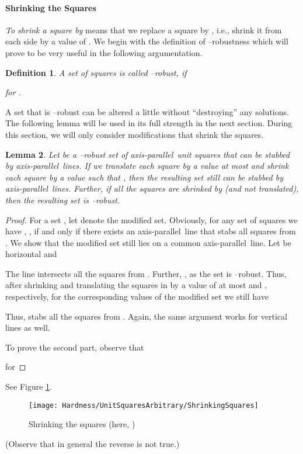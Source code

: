 \documentclass[12pt]{article}
\newtheorem{definition}{Definition}
\newtheorem{lemma}[definition]{Lemma}
\newcommand{\ap}{a.p.\ }
\renewcommand{\ap}{axis-parallel\ }
\begin{document}
\paragraph{Shrinking the Squares}
\emph{To shrink a square by } means that we replace a square  by , i.e., shrink it from each side by a value of . We begin with the definition of --robustness which will prove to be very useful in the following argumentation.
\begin{definition} A set  of squares is called \textit{--robust}, if

for .
\end{definition}
A set that is --robust can be altered a little without ``destroying'' any solutions. The following lemma will be used in its full strength in the next section. During this section, we will only consider modifications that shrink the squares. 
\begin{lemma}\label{Lemma:DeltaRobust} Let  be a --robust set of \ap unit squares that can be stabbed by  \ap lines. If we translate each square by a value at most  and shrink each square by a value  such that , then the resulting set still can be stabbed by  \ap lines. Further, if all the squares are shrinked by  (and not translated), then the resulting set is --robust.
\end{lemma}
\begin{proof} For a set , let  denote the modified set. Obviously, for any set of squares  we have , , if and only if there exists an \ap line that stabs all squares from . We show that the modified set  still lies on a common \ap line. Let  be horizontal and 
 
The line  intersects all the squares from . Further, , as the set is --robust. Thus, after shrinking and translating the squares in  by a value of at most  and , respectively, for the corresponding values  of the modified set  we still have 

Thus,  stabs all the squares from .
Again, the same argument works for vertical lines as well.

To prove the second part, observe that 

for 

\end{proof}
See Figure \ref{fig:ShrinkingSquares}.
\begin{figure}[ht]
	\centering
		\texttt{[image: Hardness/UnitSquaresArbitrary/ShrinkingSquares]}
	\caption{Shrinking the squares (here, )}
	\label{fig:ShrinkingSquares}
\end{figure}
(Observe that in general the reverse is not true.)
\end{document}
